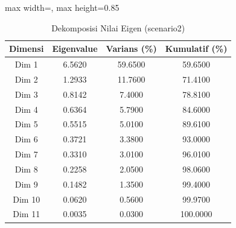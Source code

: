 \begin{table}[H]
\centering
\caption{Dekomposisi Nilai Eigen (scenario2)} \label{tab:app2eigen}
\begin{adjustbox}{max width=\textwidth, max height=0.85\textheight}
\begin{tabular}{|c|c|c|c|}
\hline
\textbf{Dimensi} & \textbf{Eigenvalue} & \textbf{Varians (\%)} & \textbf{Kumulatif (\%)} \\
\hline
Dim 1 & 6.5620 & 59.6500 & 59.6500 \\
Dim 2 & 1.2933 & 11.7600 & 71.4100 \\
Dim 3 & 0.8142 & 7.4000 & 78.8100 \\
Dim 4 & 0.6364 & 5.7900 & 84.6000 \\
Dim 5 & 0.5515 & 5.0100 & 89.6100 \\
Dim 6 & 0.3721 & 3.3800 & 93.0000 \\
Dim 7 & 0.3310 & 3.0100 & 96.0100 \\
Dim 8 & 0.2258 & 2.0500 & 98.0600 \\
Dim 9 & 0.1482 & 1.3500 & 99.4000 \\
Dim 10 & 0.0620 & 0.5600 & 99.9700 \\
Dim 11 & 0.0035 & 0.0300 & 100.0000 \\
\hline
\end{tabular}
\end{adjustbox}
\end{table}